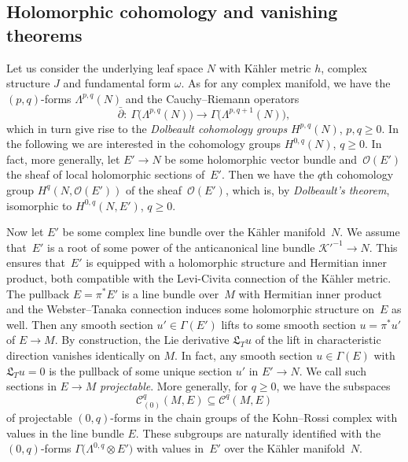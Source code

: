 \documentclass[pdftex]{sigma}
\numberwithin{equation}{section}
\begin{document}
\subsection{Holomorphic cohomology and vanishing theorems}
Let us consider the underlying leaf space $N$ with K\"ahler metric $h$, complex structure $J$ and fundamental form $\omega$.
As for any complex manifold, we have the $(p,q)$-forms $\Lambda^{p,q}(N)$ and the Cauchy--Riemann operators
\[
\bar{\partial}\colon \ \Gamma\big(\Lambda^{p,q}(N)\big)\to \Gamma\big(\Lambda^{p,q+1}(N)\big),
\]
which in turn give rise to the {\em Dolbeault cohomology groups} $H^{p,q}(N)$, $p,q\geq 0$.
In the following we are interested in the cohomology groups $H^{0,q}(N)$, $q\geq 0$.
In fact, more generally, let $E'\to N$ be some holomorphic vector bundle and~$\mathcal{O}(E')$ the sheaf of local holomorphic sections
of~$E'$. Then we have the $q$th cohomology group $H^q(N,\mathcal{O}(E'))$ of the sheaf~$\mathcal{O}(E')$, which is, by
{\em Dolbeault's theorem}, isomorphic to $H^{0,q}(N,E')$, $q\geq 0$.

Now let $E'$ be some complex line bundle over the K\"ahler manifold~$N$. We assume that~$E'$ is a root of some power of
the anticanonical line bundle $\mathcal{K}'^{-1}\to N$. This ensures that~$E'$ is equipped with a holomorphic structure and Hermitian inner product,
both compatible with the Levi-Civita connection of the K\"ahler metric.
The pullback $E=\pi^*E'$ is a line bundle over~$M$ with Hermitian inner product and the Webster--Tanaka connection induces some holomorphic structure on~$E$
as well.
Then any smooth section $u'\in\Gamma(E')$ lifts to some smooth section $u=\pi^*u'$ of $E\to M$. By construction, the Lie derivative
$\mathfrak{L}_Tu$ of the lift in characteristic direction vanishes identically on $M$. In fact, any smooth section $u\in\Gamma(E)$ with $\mathfrak{L}_Tu=0$ is the pullback of some unique section
$u'$ in $E'\to N$. We call such sections in $E\to M$ {\em projectable}.
More generally, for $q\geq 0$, we have the subspaces \[\mathcal{C}_{(0)}^q(M,E) \subseteq \mathcal{C}^q(M,E)\] of projectable $(0,q)$-forms in the chain groups
of the Kohn--Rossi complex with values in the line bundle $E$. These subgroups are
naturally identified with the $(0,q)$-forms
$\Gamma\big(\Lambda^{0,q}\otimes E'\big)$ with values in~$E'$ over the K\"ahler manifold~$N$.
\end{document}

